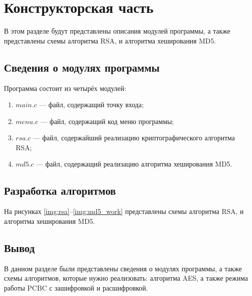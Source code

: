 \chapter{Конструкторская часть}
В этом разделе будут представлены описания модулей программы, а также представлены схемы алгоритма RSA, и алгоритма хеширования MD5.

\section{Сведения о модулях программы}
Программа состоит из четырёх модулей:
\begin{enumerate}[label=\arabic*)]
	\item $main.c$ --- файл, содержащий точку входа;
    \item $menu.c$ --- файл, содержащий код меню программы;
    \item $rsa.c$ --- файл, содержайший реализацию криптографического алгоритма  RSA;
    \item $md5.c$ --- файл, содержащий реализацию алгоритма хеширования MD5.
\end{enumerate}

\section{Разработка алгоритмов}
На рисунках \ref{img:rsa}--\ref{img:md5_work} представлены схемы алгоритма RSA, и алгоритма хеширования MD5.
\clearpage

\clearpage
{}

\section*{Вывод}

В данном разделе были представлены сведения о модулях программы, а также схемы алгоритмов, которые нужно реализовать: алгоритма AES, а также режима работы PCBC с зашифровкой и расшифровкой.
